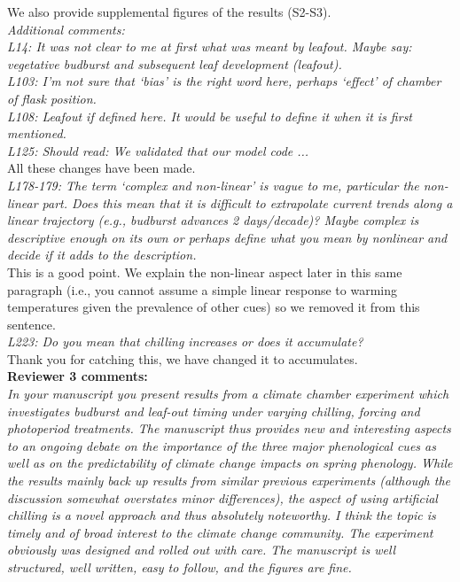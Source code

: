 \documentclass[11pt,a4paper]{article}
\begin{document}
We also provide supplemental figures of the results (S2-S3). \\

\emph{Additional comments:\\
L14: It was not clear to me at first what was meant by leafout. Maybe say: vegetative
budburst and subsequent leaf development (leafout).\\
L103: I’m not sure that ‘bias’ is the right word here, perhaps ‘effect’ of chamber of flask
position.\\
L108: Leafout if defined here. It would be useful to define it when it is first mentioned.\\
L125:  Should read: We validated that our model code ...}\\

All these changes have been made.\\

\emph{L178-179: The term ‘complex and non-linear’ is vague to me, particular the non-linear part.
Does this mean that it is difficult to extrapolate current trends along a linear trajectory
(e.g., budburst advances 2 days/decade)?  Maybe complex is descriptive enough on its own or
perhaps define what you mean by nonlinear and decide if it adds to the description.}\\

This is a good point. We explain the non-linear aspect later in this same paragraph (i.e., you cannot assume a simple linear response to warming temperatures given the prevalence of other cues) so we removed it from this sentence.\\

\emph{L223: Do you mean that chilling increases or does it accumulate?}\\

Thank you for catching this, we have changed it to accumulates.  \\


{\bf Reviewer 3 comments:} \\


\emph{In your manuscript you present results from a climate chamber experiment which investigates
budburst and leaf-out timing under varying chilling, forcing and photoperiod treatments.
The manuscript thus provides new and interesting aspects to an ongoing debate on the
importance of the three major phenological cues as well as on the predictability of climate
change impacts on spring phenology. While the results mainly back up results from similar
previous experiments (although the discussion somewhat overstates minor differences), the
aspect of using artificial chilling is a novel approach and thus absolutely noteworthy.
I think the topic is timely and of broad interest to the climate change community. The
experiment obviously was designed and rolled out with care. The manuscript is well
structured, well written, easy to follow, and the figures are fine.}\\
\end{document}
